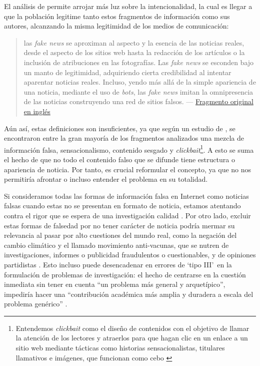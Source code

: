 El análisis de \citet{Tandoc2017} permite arrojar más luz sobre la intencionalidad, la cual es llegar a que la población legitime tanto estos fragmentos de información como sus autores, alcanzando la misma legitimidad de los medios de comunicación:

\label{frag3esp}
\begin{quotation}
    las \emph{fake news} se aproximan al aspecto y la esencia de las noticias reales, desde el aspecto de los sitios web hasta la redacción de los artículos o la inclusión de atribuciones en las fotografías. Las \emph{fake news} se esconden bajo un manto de legitimidad, adquiriendo cierta credibilidad al intentar aparentar noticias reales. Incluso, yendo más allá de la simple apariencia de una noticia, mediante el uso de \emph{bots}, las \emph{fake news} imitan la omnipresencia de las noticias construyendo una red de sitios falsos.  --- \hyperref[frag3eng]{Fragmento original en inglés}
\end{quotation}

Aún así, estas definiciones son insuficientes, ya que según un estudio de \citet{Mourao2019}, se encontraron entre la gran mayoría de los fragmentos analizados una mezcla de información falsa, sensacionalismo, contenido sesgado y \emph{clickbait}\footnote{Entendemos \textit{clickbait} como el diseño de contenidos con el objetivo de llamar la atención de los lectores y atraerlos para que hagan clic en un enlace
a un sitio web mediante tácticas como historias sensacionalistas, titulares llamativos e imágenes, que funcionan
como cebo \citep{Chen2015,Blom2015}}. A esto se suma el hecho de que no todo el contenido falso que se difunde tiene estructura o apariencia de noticia. Por tanto, es crucial reformular el concepto, ya que no nos permitiría afrontar o incluso entender el problema en su totalidad.

Si consideramos todas las formas de información falsa en Internet como noticias falsas cuando estas no se presentan en formato de noticia, estamos atentando contra el rigor que se espera de una investigación calidad \citep{MacKenzie2011,Suddaby2010,Zhang2016}. Por otro lado, excluir estas formas de falsedad por no tener carácter de noticia podría mermar su relevancia al pasar por alto cuestiones del mundo real, como la negación del cambio climático y el llamado movimiento anti-vacunas, que se nutren de investigaciones, informes o publicidad fraudulentos o cuestionables, y de opiniones partidistas \citep{Khan2021}. Esto incluso puede desencadenar en errores de `tipo III'\ en la formulación de problemas de investigación: el hecho de centrarse en la cuestión inmediata sin tener en cuenta ``un problema más general y arquetípico'', impediría hacer una ``contribución académica más amplia y duradera a escala del problema genérico'' \citep{Rai2017}.

